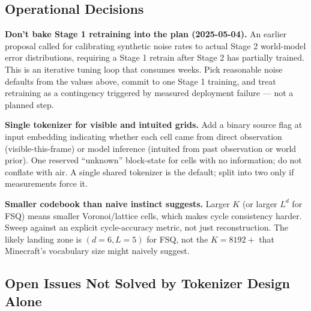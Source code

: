 \documentclass[11pt,a4paper]{article}
\begin{document}
\subsection{Operational Decisions}

\begin{designdecision}
\textbf{Don't bake Stage 1 retraining into the plan (2025-05-04).} An earlier proposal called for calibrating synthetic noise rates to actual Stage 2 world-model error distributions, requiring a Stage 1 retrain after Stage 2 has partially trained. This is an iterative tuning loop that consumes weeks. Pick reasonable noise defaults from the values above, commit to one Stage 1 training, and treat retraining as a contingency triggered by measured deployment failure --- not a planned step.
\end{designdecision}

\begin{designdecision}
\textbf{Single tokenizer for visible and intuited grids.} Add a binary source flag at input embedding indicating whether each cell came from direct observation (visible-this-frame) or model inference (intuited from past observation or world prior). One reserved ``unknown'' block-state for cells with no information; do not conflate with air. A single shared tokenizer is the default; split into two only if measurements force it.
\end{designdecision}

\begin{designdecision}
\textbf{Smaller codebook than naive instinct suggests.} Larger $K$ (or larger $L^d$ for FSQ) means smaller Voronoi/lattice cells, which makes cycle consistency harder. Sweep against an explicit cycle-accuracy metric, not just reconstruction. The likely landing zone is $(d=6, L=5)$ for FSQ, not the $K=8192+$ that Minecraft's vocabulary size might naively suggest.
\end{designdecision}

\subsection{Open Issues Not Solved by Tokenizer Design Alone}
\end{document}
